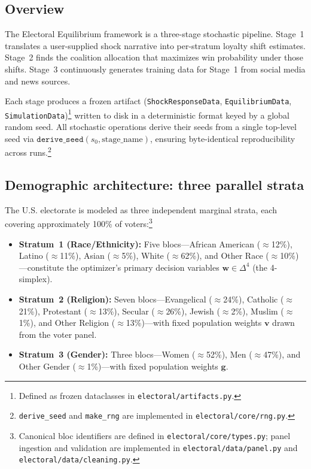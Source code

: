 \documentclass[12pt, letterpaper]{article}
\theoremstyle{definition}
\newcommand{\boldw}{\mathbf{w}}
\begin{document}
\subsection{Overview}

The Electoral Equilibrium framework is a three-stage stochastic pipeline.
Stage~1 translates a user-supplied shock narrative into per-stratum loyalty
shift estimates. Stage~2 finds the coalition allocation that maximizes win
probability under those shifts. Stage~3 continuously generates training data
for Stage~1 from social media and news sources.

Each stage produces a frozen artifact (\texttt{ShockResponseData},
\texttt{EquilibriumData}, \texttt{SimulationData})\footnote{Defined as frozen
dataclasses in \texttt{electoral/artifacts.py}.} written to disk in a
deterministic format keyed by a global random seed. All stochastic operations
derive their seeds from a single top-level seed via $\texttt{derive\_seed}(s_0,
\text{stage\_name})$, ensuring byte-identical reproducibility across
runs.\footnote{\texttt{derive\_seed} and \texttt{make\_rng} are implemented in
\texttt{electoral/core/rng.py}.}

\subsection{Demographic architecture: three parallel strata}

The U.S. electorate is modeled as three independent marginal strata, each
covering approximately 100\% of voters:\footnote{Canonical bloc identifiers are
defined in \texttt{electoral/core/types.py}; panel ingestion and validation are
implemented in \texttt{electoral/data/panel.py} and
\texttt{electoral/data/cleaning.py}.}

\begin{itemize}
  \item \textbf{Stratum~1 (Race/Ethnicity):} Five blocs---African American
    ($\approx$12\%), Latino ($\approx$11\%), Asian ($\approx$5\%), White
    ($\approx$62\%), and Other Race ($\approx$10\%)---constitute the
    optimizer's primary decision variables $\boldw \in \Delta^4$ (the
    4-simplex).

  \item \textbf{Stratum~2 (Religion):} Seven blocs---Evangelical
    ($\approx$24\%), Catholic ($\approx$21\%), Protestant ($\approx$13\%),
    Secular ($\approx$26\%), Jewish ($\approx$2\%), Muslim ($\approx$1\%),
    and Other Religion ($\approx$13\%)---with fixed population weights
    $\mathbf{v}$ drawn from the voter panel.

  \item \textbf{Stratum~3 (Gender):} Three blocs---Women ($\approx$52\%),
    Men ($\approx$47\%), and Other Gender ($\approx$1\%)---with fixed
    population weights $\mathbf{g}$.
\end{itemize}
\end{document}
